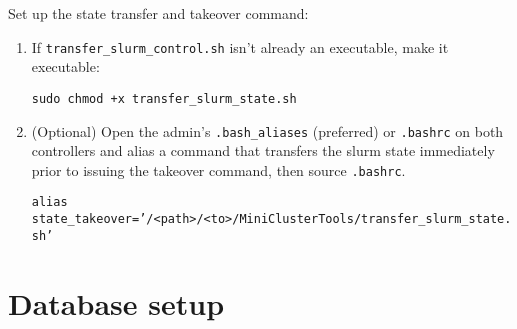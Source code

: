 \noindent Set up the state transfer and takeover command:

\begin{enumerate}
\item If \texttt{transfer\_slurm\_control.sh} isn't already an executable, make it executable:

	\texttt{sudo chmod +x transfer\_slurm\_state.sh}

\item (Optional) Open the admin's \texttt{.bash\_aliases} (preferred) or \texttt{.bashrc} on both controllers and alias a command that transfers the slurm state immediately prior to issuing the takeover command, then source \texttt{.bashrc}.

	\texttt{alias state\_takeover='/<path>/<to>/MiniClusterTools/transfer\_slurm\_state.sh'}
\end{enumerate}


\section{Database setup} \label{sec:slurmDB}

